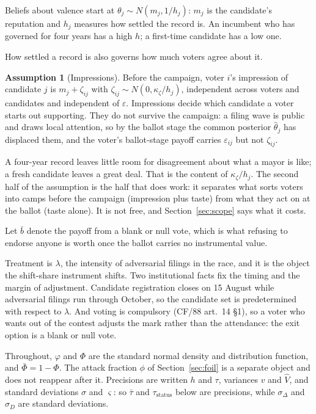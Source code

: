\documentclass[11pt]{article}
\theoremstyle{definition}
\newtheorem{assumption}{Assumption}
\theoremstyle{remark}
\begin{document}
Beliefs about valence start at $\theta_j \sim N(m_j, 1/h_j)$: $m_j$ is the
candidate's reputation and $h_j$ measures how settled the record is. An
incumbent who has governed for four years has a high $h$; a first-time
candidate has a low one.

How settled a record is also governs how much voters agree about it.

\begin{assumption}[Impressions]
\label{as:impressions}
Before the campaign, voter $i$'s impression of candidate $j$ is
$m_j + \zeta_{ij}$ with $\zeta_{ij} \sim N(0, \kappa_\zeta/h_j)$, independent
across voters and candidates and independent of $\varepsilon$. Impressions
decide which candidate a voter starts out supporting. They do not survive the
campaign: a filing wave is public and draws local attention, so by the ballot
stage the common posterior $\hat\theta_j$ has displaced them, and the voter's
ballot-stage payoff carries $\varepsilon_{ij}$ but not $\zeta_{ij}$.
\end{assumption}

A four-year record leaves little room for disagreement about what a mayor is
like; a fresh candidate leaves a great deal. That is the content of
$\kappa_\zeta/h_j$. The second half of the assumption is the half that does
work: it separates what sorts voters into camps before the campaign
(impression plus taste) from what they act on at the ballot (taste alone).
It is not free, and Section~\ref{sec:scope} says what it costs.

Let $\bar b$ denote the payoff from a blank or null vote, which is what
refusing to endorse anyone is worth once the ballot carries no instrumental
value.

Treatment is $\lambda$, the intensity of adversarial filings in the race, and
it is the object the shift-share instrument shifts. Two institutional facts
fix the timing and the margin of adjustment. Candidate registration closes on
15 August while adversarial filings run through October, so the candidate set
is predetermined with respect to $\lambda$. And voting is compulsory
(CF/88 art.~14 \S1), so a voter who wants out of the contest adjusts the mark
rather than the attendance: the exit option is a blank or null vote.

Throughout, $\varphi$ and $\Phi$ are the standard normal density and
distribution function, and $\bar\Phi = 1 - \Phi$. The attack fraction $\phi$
of Section~\ref{sec:foil} is a separate object and does not reappear after it.
Precisions are written $h$ and $\tau$, variances $v$ and $\hat V$, and
standard deviations $\sigma$ and $\varsigma$: so $\bar\tau$ and
$\tau_{\mathrm{status}}$ below are precisions, while $\sigma_\Delta$ and
$\sigma_D$ are standard deviations.
\end{document}
